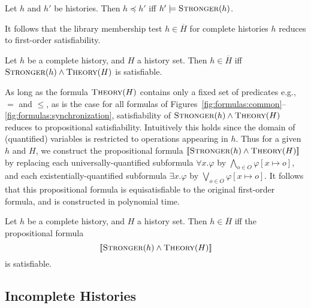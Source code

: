 \begin{lemma}
  \label{lem:stronger_form_complete}
  
  Let $h$ and $h'$ be histories.
  Then $h \preceq h'$ if{f} $h' \models \textsc{Stronger}(h)$.

\end{lemma}

\noindent
It follows that the library membership test $h \in \overline{H}$ for complete
histories $h$ reduces to first-order satisfiability.

\begin{theorem}
  \label{th:satisfiability_pending}

  Let $h$ be a complete history, and $H$ a history set.
  Then $h \in \overline{H}$ if{f}
  $\textsc{Stronger}(h) \land \textsc{Theory}(H)$ is satisfiable.

\end{theorem}

As long as the formula $\textsc{Theory}(H)$ contains only a fixed set of
predicates e.g.,~$=$ and $\leq$, as is the case for all formulas of
Figures~\ref{fig:formulas:common}--\ref{fig:formulas:synchronization},
satisfiability of $\textsc{Stronger}(h) \land \textsc{Theory}(H)$ reduces to
propositional satisfiability. Intuitively this holds since the domain of
(quantified) variables is restricted to operations appearing in $h$. Thus for a
given $h$ and $H$, we construct the propositional formula
$[\![{\textsc{Stronger}(h) \land \textsc{Theory}(H)}]\!]$ by replacing each
universally-quantified subformula $\forall x. \varphi$ by $\bigwedge_{o \in O} \varphi[x
\mapsto o]$, and each existentially-quantified subformula $\exists x. \varphi$ by
$\bigvee_{o \in O} \varphi[x \mapsto o]$. It follows that this propositional formula is
equisatisfiable to the original first-order formula, and is constructed in
polynomial time.

\begin{corollary}
  \label{cor:satisfiability_complete}

  Let $h$ be a complete history, and $H$ a history set.
  Then $h \in \overline{H}$ if{f} the propositional formula
  $$[\![{\textsc{Stronger}(h) \land \textsc{Theory}(H)}]\!]$$
  is satisfiable.

\end{corollary}

\subsection{Incomplete Histories}
\label{sec:propositional:pending}

